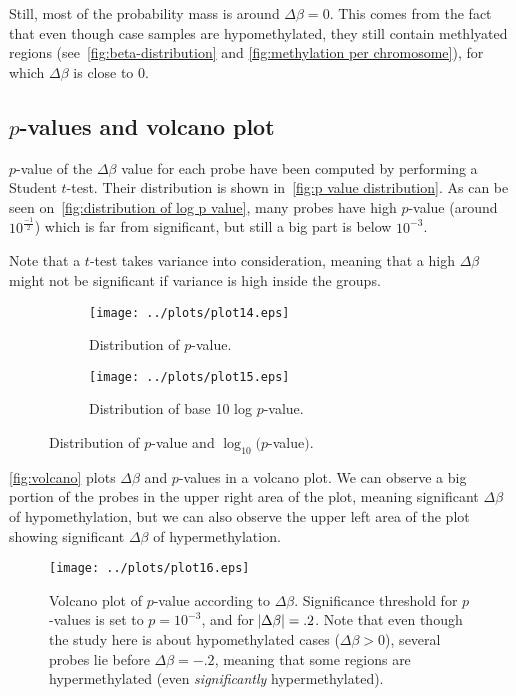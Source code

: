 \documentclass{article}
\begin{document}
Still, most of the probability mass is around $\Delta\beta = 0$. This comes from the fact that even though case samples are hypomethylated,
they still contain methlyated regions (see~\autoref{fig:beta-distribution} and \autoref{fig:methylation per chromosome}),
for which $\Delta\beta$ is close to 0.

\subsection{$p$-values and volcano plot}

$p$-value of the $\Delta\beta$ value for each probe have been computed by performing a Student $t$-test. Their distribution is shown
in~\autoref{fig:p value distribution}. As can be seen on~\autoref{fig:distribution of log p value}, many probes have high $p$-value (around
$10^{\frac {-1}2}$) which is far from significant, but still a big part is below $10^{-3}$.

Note that a $t$-test takes variance into consideration, meaning that a high $\Delta\beta$ might not be significant if variance is high
inside the groups.

\begin{figure}[!h]
	\begin{subfigure}{.5\textwidth}
		\texttt{[image: ../plots/plot14.eps]}
		\caption{Distribution of $p$-value.\label{fig:distribution of p values}}
	\end{subfigure}
	\begin{subfigure}{.5\textwidth}
		\texttt{[image: ../plots/plot15.eps]}
		\caption{Distribution of base 10 log $p$-value.\label{fig:distribution of log p value}}
	\end{subfigure}
	\caption{Distribution of $p$-value and $\log_{10}(p$-value$)$.\label{fig:p value distribution}}
\end{figure}

\autoref{fig:volcano} plots $\Delta\beta$ and $p$-values in a volcano plot. We can observe a big portion of the probes in the upper
right area of the plot, meaning significant $\Delta\beta$ of hypomethylation, but we can also observe the upper left area of the plot
showing significant $\Delta\beta$ of hypermethylation.

\begin{figure}
	\centering
	\texttt{[image: ../plots/plot16.eps]}
	\caption{Volcano plot of $p$-value according to $\Delta\beta$. Significance threshold for $p$-values is set to $p = 10^{-3}$, and for
	$\abs {\Delta\beta} = .2$. Note that even though the study here is about hypomethylated cases ($\Delta\beta > 0$), several probes lie
	before $\Delta\beta = -.2$, meaning that some regions are hypermethylated (even \textit{significantly} hypermethylated).
	\label{fig:volcano}}
\end{figure}
\end{document}
